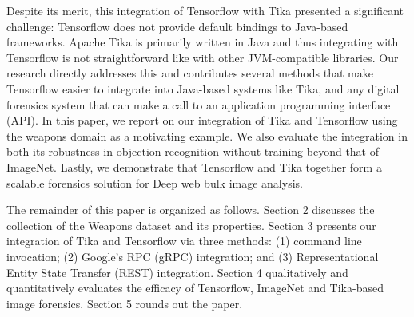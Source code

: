 Despite its merit, this integration of Tensorflow with Tika presented a significant challenge: Tensorflow does not provide default bindings to Java-based frameworks. Apache Tika is primarily written in Java and thus integrating with Tensorflow is not straightforward like with other JVM-compatible libraries. Our research directly addresses this and contributes several methods that make Tensorflow easier to integrate into Java-based systems like Tika, and any digital forensics system that can make a call to an application programming interface (API). In this paper, we report on our integration of Tika and Tensorflow using the weapons domain as a motivating example. We also evaluate the integration in both its robustness in objection recognition without training beyond that of ImageNet. Lastly, we demonstrate that Tensorflow and Tika together form  a scalable forensics solution for Deep web bulk image analysis.

The remainder of this paper is organized as follows. Section 2 discusses the collection of the Weapons dataset and its properties. Section 3 presents our integration of Tika and Tensorflow via three methods: (1) command line invocation; (2) Google's RPC (gRPC) integration; and (3) Representational Entity State Transfer (REST) \cite{Fielding:2000:ASD:932295} integration. Section 4 qualitatively and quantitatively evaluates the efficacy of Tensorflow, ImageNet and Tika-based image forensics. Section 5 rounds out the paper.
